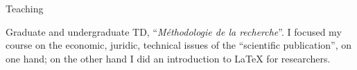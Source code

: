 










\begin{rubric}{Teaching}
                                \entry*[]
                                
                            Graduate and undergraduate TD,
                        \enquote{\textit{Méthodologie de la recherche}}. I
                        focused my course on the economic, juridic, technical
                        issues of the \enquote{scientific publication}, on one
                        hand; on the other hand I did an introduction to \LaTeX
                        for researchers.
                    
                                \entry*
                            
                    
                                \entry*
                            
                    
                                \entry*
                            
                    \end{rubric}


